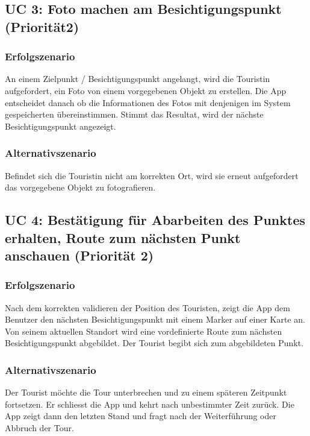 \documentclass[a4paper,10pt,xetex]{article}
\begin{document}
\subsection{UC 3: Foto machen am Besichtigungspunkt (Priorität2)}\label{uc-3-user-macht-foto-am-besichtigungspunkt-priorituxe4t-2}
\subsubsection{Erfolgszenario}\label{erfolgszenario-1}
An einem Zielpunkt / Besichtigungspunkt angelangt, wird die Touristin aufgefordert, ein Foto von einem vorgegebenen Objekt zu erstellen. Die
App entscheidet danach ob die Informationen des Fotos mit denjenigen im
System gespeicherten übereinstimmen. Stimmt das Resultat, wird der
nächste Besichtigungspunkt angezeigt.


\subsubsection{Alternativszenario}\label{alternativszenario}
Befindet sich die Touristin nicht am korrekten Ort, wird sie erneut
aufgefordert das vorgegebene Objekt zu fotografieren.


\subsection{UC 4: Bestätigung für Abarbeiten des Punktes erhalten, Route zum nächsten Punkt anschauen (Priorität 2)}\label{uc-4-user-bekommt-bestuxe4tigung-fuxfcr-das-abarbeiten-des-punktes-die-route-zum-nuxe4chsten-punkt-wird-angezeigt.-priorituxe4t-2}
\subsubsection{Erfolgszenario}\label{erfolgszenario-2}
Nach dem korrekten validieren der Position des Touristen, zeigt die App
dem Benutzer den nächsten Besichtigungspunkt mit einem Marker auf einer
Karte an. Von seinem aktuellen Standort wird eine vordefinierte Route
zum nächsten Besichtigungspunkt abgebildet. Der Tourist begibt sich zum
abgebildeten Punkt.


\subsubsection{Alternativszenario}\label{alternativszenario-1}
Der Tourist möchte die Tour unterbrechen und zu einem späteren
Zeitpunkt fortsetzen. Er schliesst die App und kehrt nach unbestimmter
Zeit zurück. Die App zeigt dann den letzten Stand und fragt nach der
Weiterführung oder Abbruch der Tour.
\end{document}
